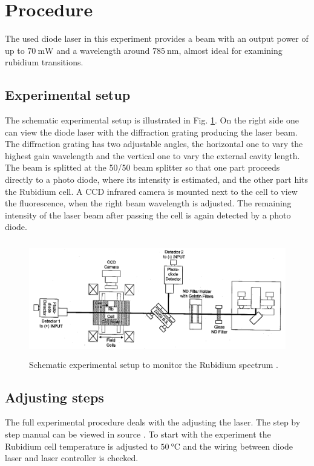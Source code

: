 \section{Procedure}
\label{sec:procedure}

The used diode laser in this experiment provides a beam with an output power of up to $\SI{70}{\milli\watt}$
and a wavelength around $\SI{785}{\nano\meter}$, almost ideal for examining rubidium transitions.

\subsection{Experimental setup}

The schematic experimental setup is illustrated in Fig. \ref{fig:setup}.
On the right side one can view the diode laser with the diffraction grating producing the laser beam.
The diffraction grating has two adjustable angles, the horizontal one to vary the highest gain wavelength and the vertical
one to vary the external cavity length.
The beam is splitted at the 50/50 beam splitter so that one part proceeds directly to a photo diode, where
its intensity is estimated, and the other part hits the Rubidium cell. A CCD infrared camera is mounted next to the cell
to view the fluorescence, when the right beam wavelength is adjusted. The remaining intensity of the laser beam
after passing the cell is again detected by a photo diode.

\begin{figure}
  \centering
  \includegraphics[height=5cm]{Ordnername/setup.png}
  \caption{Schematic experimental setup to monitor the Rubidium spectrum \cite{manual}.}
  \label{fig:setup}
\end{figure}

\subsection{Adjusting steps}

The full experimental procedure deals with the adjusting the laser. The step by step
manual can be viewed in source \cite{manual}. To start with the experiment the Rubidium cell temperature
is adjusted to $\SI{50}{\celsius}$ and the wiring between diode laser and laser controller is checked.

